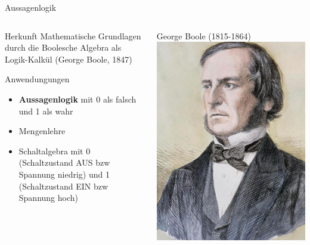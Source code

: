 \documentclass[xelatex,aspectratio=169]{beamer}
\begin{document}
\begin{frame}{Aussagenlogik}
  \begin{columns}
    \begin{column}{0.65\textwidth}
      \begin{block}{Herkunft}
        Mathematische Grundlagen durch die Boolesche Algebra als Logik-Kalkül (George Boole, 1847)
      \end{block}
      \begin{block}{Anwendungungen}
        \begin{itemize}
          \item \textbf{Aussagenlogik} mit 0 als falsch und 1 als wahr
          \item Mengenlehre
          \item Schaltalgebra mit 0 (Schaltzustand AUS bzw Spannung niedrig) und 1 (Schaltzustand EIN bzw Spannung hoch)
        \end{itemize}

      \end{block}
    \end{column}
    \begin{column}{0.35\textwidth}
      \centering George Boole (1815-1864)
      \includegraphics[height=.7\textheight]{img/George_Boole.jpg}
    \end{column}
  \end{columns}
\end{frame}
\end{document}
